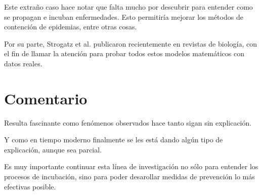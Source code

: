 \documentclass[12pt, letterpaper]{article}
\begin{document}
    Este extraño caso hace notar que falta mucho por descubrir para entender 
    como se propagan e incuban enfermedades. Esto permitiría mejorar los métodos
    de contención de epidemias, entre otras cosas.

    Por su parte, Strogatz et al. publicaron recientemente en revistas de 
    biología, con el fin de llamar la atención para probar todos estos modelos 
    matemáticos con datos reales.

    \section*{Comentario}
    Resulta fascinante como fenómenos observados hace tanto sigan sin 
    explicación.

    Y como en tiempo moderno finalmente se les está dando algún tipo de 
    explicación, aunque sea parcial.

    Es muy importante continuar esta línea de investigación no sólo para 
    entender los procesos de incubación, sino para poder desarollar medidas de 
    prevención lo más efectivas posible.
\end{document}
